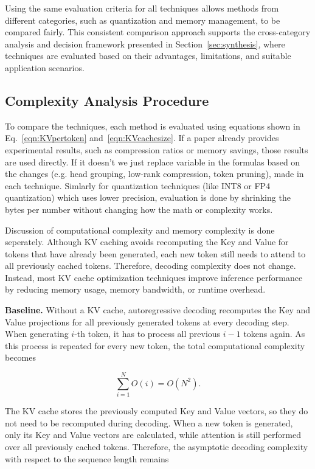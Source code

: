 \documentclass[conference]{IEEEtran}
\begin{document}
Using the same evaluation criteria for all techniques allows methods from different categories, such as quantization and memory management, to be compared fairly. This consistent comparison approach supports the cross-category analysis and decision framework presented in Section~\ref{sec:synthesis}, where techniques are evaluated based on their advantages, limitations, and suitable application scenarios.

\subsection{Complexity Analysis Procedure}
\label{sec:complexity}

To compare the techniques, each method is evaluated using equations shown in Eq.~\eqref{eqn:KVpertoken} and~\eqref{eqn:KVcachesize}. If a paper already provides experimental results, such as compression ratios or memory savings, those results are used directly. If it doesn't we just replace variable in the formulas based on the changes (e.g. head grouping, low-rank compression, token pruning), made in each technique. Simlarly for quantization techniques (like INT8 or FP4 quantization) which uses lower precision, evaluation is done by shrinking the bytes per number without changing how the math or complexity works.

Discussion of computational complexity and memory complexity is done seperately. Although KV caching avoids recomputing the Key and Value for tokens that have already been generated, each new token still needs to attend to all previously cached tokens. Therefore, decoding complexity does not change. Instead, most KV cache optimization techniques improve inference performance by reducing memory usage, memory bandwidth, or runtime overhead.

\textbf{Baseline.} Without a KV cache, autoregressive decoding recomputes the Key and Value projections for all previously generated tokens at every decoding step. When generating $i$-th token, it has to process all previous $i-1$ tokens again. As this process is repeated for every new token, the total computational complexity becomes

\[
	\sum_{i=1}^{N}O(i)=O(N^2).
\]

The KV cache stores the previously computed Key and Value vectors, so they do not need to be recomputed during decoding. When a new token is generated, only its Key and Value vectors are calculated, while attention is still performed over all previously cached tokens. Therefore, the asymptotic decoding complexity with respect to the sequence length remains
\end{document}
